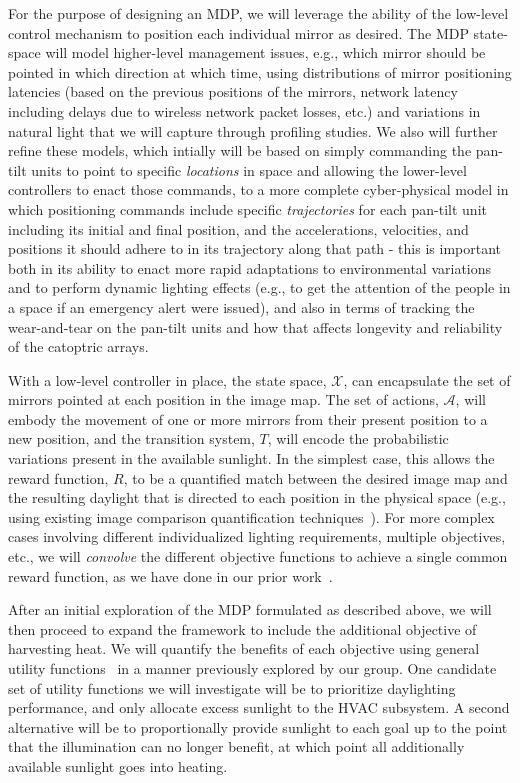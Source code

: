 For the purpose of designing an MDP, we will leverage the ability of the low-level
control mechanism to position each individual mirror as desired.  The MDP state-space 
will model higher-level management issues, e.g., which mirror should be pointed in which 
direction at which time, using distributions of mirror positioning latencies (based on 
the previous positions of the mirrors, network latency including delays due to wireless
network packet losses, etc.) and variations in natural light that we will capture through 
profiling studies.  We also will further refine these models, which intially will be based
on simply commanding the pan-tilt units to point to specific \emph{locations} in space and 
allowing the lower-level controllers to enact those commands, to a more complete cyber-physical
model in which positioning commands include specific \emph{trajectories} for each pan-tilt 
unit including its initial and final position, and the accelerations, velocities, and positions
it should adhere to in its trajectory along that path - this is important both in its
ability to enact more rapid adaptations to environmental variations and to perform dynamic
lighting effects (e.g., to get the attention of the people in a space if an emergency
alert were issued), and also in terms of tracking the wear-and-tear on the pan-tilt units and 
how that affects longevity and reliability of the catoptric arrays.

With a low-level controller in place, the state space, $\mathcal{X}$,
can encapsulate the set of mirrors pointed at each position in
the image map.  The set of actions, $\mathcal{A}$, will embody the movement
of one or more mirrors from their present position to a new position,
and the transition system, $T$, will encode the probabilistic variations
present in the available sunlight.  In the simplest case, this allows the 
reward function, $R$, to be a quantified match between the desired image 
map and the resulting daylight that is directed to each position in the physical space
(e.g., using existing image comparison quantification techniques~\cite{ds99,my09,wbo97}).
For more complex cases involving different individualized lighting requirements,
multiple objectives, etc., we will \emph{convolve} the different objective
functions to achieve a single common reward function, as we have done
in our prior work~\cite{tblwgs11,tggs10}.

After an initial exploration of the MDP formulated as described above,
we will then proceed to expand the framework to include the additional
objective of harvesting heat.  We will quantify the benefits of each
objective using general utility functions~\cite{tggs10} in a manner previously
explored by our group. One candidate set of utility functions we will
investigate will be to prioritize daylighting performance, and only
allocate excess sunlight to the HVAC subsystem. A second alternative
will be to proportionally provide sunlight to each goal up to the point
that the illumination can no longer benefit, at which point all additionally
available sunlight goes into heating.


